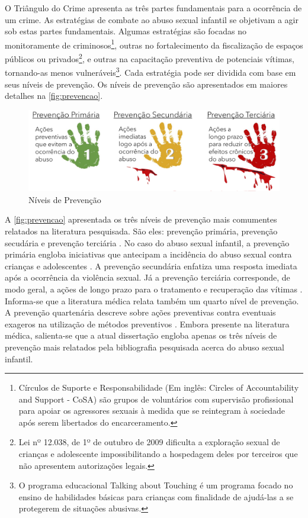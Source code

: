 
O Triângulo do Crime apresenta as três partes fundamentais para a ocorrência de um crime. As estratégias de combate ao abuso sexual infantil se objetivam a agir sob estas partes fundamentais. Algumas estratégias são focadas no monitoramente de criminosos\footnote{\label{note:nota1}Círculos de Suporte e Responsabilidade (Em inglês: Circles of Accountability and Support - CoSA) são grupos de voluntários com supervisão profissional para apoiar os agressores sexuais à medida que se reintegram à sociedade após serem libertados do encarceramento.}, outras no fortalecimento da fiscalização de espaços públicos ou privados\footnote{Lei nº 12.038, de 1º de outubro de 2009 dificulta a exploração sexual de crianças e adolescente impossibilitando a hospedagem deles por terceiros que não apresentem autorizações legais.}, e outras na capacitação preventiva de potenciais vítimas, tornando-as menos vulneráveis\footnote{O programa educacional Talking about Touching é um programa focado no ensino de habilidades básicas para crianças com finalidade de ajudá-las a se protegerem de situações abusivas.}. Cada estratégia pode ser dividida com base em seus níveis de prevenção. Os níveis de prevenção são apresentados em maiores detalhes na \autoref{fig:prevencao}.

\begin{figure}[htb]
	\caption{\label{fig:prevencao}Níveis de Prevenção}
  \begin{center}
    \includegraphics[width=\linewidth]{./Figuras/Prevencao.pdf}
	\end{center}
\end{figure}

A \autoref{fig:prevencao} apresentada os três níveis de prevenção mais comumentes relatados na literatura pesquisada. São eles: prevenção primária, prevenção secudária e prevenção terciária \cite{dahlberg2006violencia, santos2011guia, maria2012abusos}. No caso do abuso sexual infantil, a prevenção primária engloba iniciativas que antecipam a incidência do abuso sexual contra crianças e adolescentes  \cite{marcelino2017vamos}. A prevenção secundária enfatiza uma resposta imediata após a ocorrência da violência sexual. Já a prevenção terciária corresponde, de modo geral, a ações de longo prazo para o tratamento e recuperação das vítimas \cite{people2020expert}. Informa-se que a literatura médica relata também um quarto nível de prevenção. A prevenção quartenária descreve sobre ações preventivas contra eventuais exageros na utilização de métodos preventivos \cite{tesser2017importante}. Embora presente na literatura médica, salienta-se que a atual dissertação engloba apenas os três níveis de prevenção mais relatados pela bibliografia pesquisada acerca do abuso sexual infantil.

